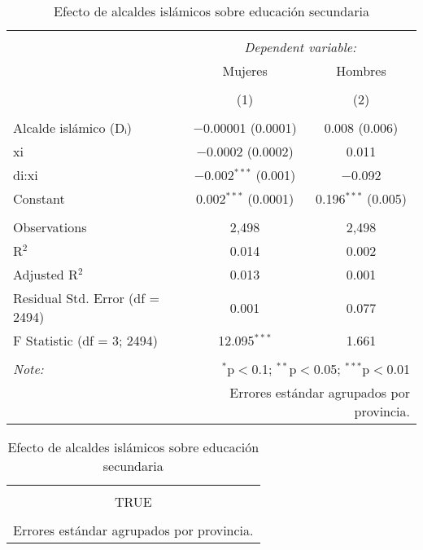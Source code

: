 
\begin{table}[ht!] \centering 
  \caption{Efecto de alcaldes islámicos sobre educación secundaria} 
  \label{tab:rd_mujeres_hombres} 
\begin{tabular}{@{\extracolsep{5pt}}lcc} 
\\[-1.8ex]\hline 
\hline \\[-1.8ex] 
 & \multicolumn{2}{c}{\textit{Dependent variable:}} \\ 
\cline{2-3} 
 & Mujeres & Hombres \\ 
\\[-1.8ex] & (1) & (2)\\ 
\hline \\[-1.8ex] 
 Alcalde islámico (Dᵢ) & $-$0.00001 (0.0001) & 0.008 (0.006) \\ 
  xi & $-$0.0002 (0.0002) & 0.011 \\ 
  di:xi & $-$0.002$^{***}$ (0.001) & $-$0.092 \\ 
  Constant & 0.002$^{***}$ (0.0001) & 0.196$^{***}$ (0.005) \\ 
 \hline \\[-1.8ex] 
Observations & 2,498 & 2,498 \\ 
R$^{2}$ & 0.014 & 0.002 \\ 
Adjusted R$^{2}$ & 0.013 & 0.001 \\ 
Residual Std. Error (df = 2494) & 0.001 & 0.077 \\ 
F Statistic (df = 3; 2494) & 12.095$^{***}$ & 1.661 \\ 
\hline 
\hline \\[-1.8ex] 
\textit{Note:}  & \multicolumn{2}{r}{$^{*}$p$<$0.1; $^{**}$p$<$0.05; $^{***}$p$<$0.01} \\ 
 & \multicolumn{2}{r}{Errores estándar agrupados por provincia.} \\ 
\end{tabular} 
\end{table} 

\begin{table}[ht!] \centering 
  \caption{Efecto de alcaldes islámicos sobre educación secundaria} 
  \label{tab:rd_mujeres_hombres} 
\begin{tabular}{@{\extracolsep{5pt}} c} 
\\[-1.8ex]\hline 
\hline \\[-1.8ex] 
TRUE \\ 
\hline \\[-1.8ex] 
\multicolumn{1}{l}{Errores estándar agrupados por provincia.} \\ 
\end{tabular} 
\end{table} 
